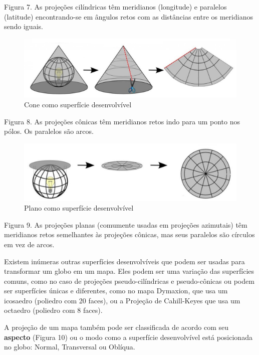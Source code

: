 \documentclass[
]{book}
\begin{document}
Figura 7. As projeções cilíndricas têm meridianos (longitude) e paralelos (latitude) encontrando-se em ângulos retos com as distâncias entre os meridianos sendo iguais.

\begin{figure}
\centering
\includegraphics{media/modulo0/cone.png}
\caption{Cone como superfície desenvolvível}
\end{figure}

Figura 8. As projeções cônicas têm meridianos retos indo para um ponto nos pólos. Os paralelos são arcos.

\begin{figure}
\centering
\includegraphics{media/modulo0/plane.png}
\caption{Plano como superfície desenvolvível}
\end{figure}

Figura 9. As projeções planas (comumente usadas em projeções azimutais) têm meridianos retos semelhantes às projeções cônicas, mas seus paralelos são círculos em vez de arcos.

Existem inúmeras outras superfícies desenvolvíveis que podem ser usadas para transformar um globo em um mapa. Eles podem ser uma variação das superfícies comuns, como no caso de projeções pseudo-cilíndricas e pseudo-cônicas ou podem ser superfícies únicas e diferentes, como no mapa Dymaxion, que usa um icosaedro (poliedro com 20 faces), ou a Projeção de Cahill-Keyes que usa um octaedro (poliedro com 8 faces).

A projeção de um mapa também pode ser classificada de acordo com seu \textbf{aspecto} (Figura 10) ou o modo como a superfície desenvolvível está posicionada no globo: Normal, Transversal ou Oblíqua.
\end{document}
